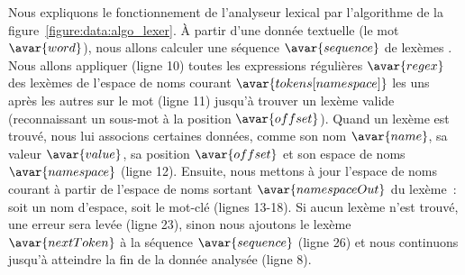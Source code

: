 Nous expliquons le fonctionnement de l'analyseur lexical par l'algorithme de la
figure~\ref{figure:data:algo_lexer}. À partir d'une donnée textuelle (le mot
$\avar{word}$), nous allons calculer une séquence $\avar{sequence}$ de lexèmes .
Nous allons appliquer (ligne 10) toutes les expressions régulières
$\avar{regex}$ des lexèmes de l'espace de noms courant
$\avar{tokens[namespace]}$ les uns après les autres sur le mot (ligne 11)
jusqu'à trouver un lexème valide (reconnaissant un sous-mot à la position
$\avar{offset}$). Quand un lexème est trouvé, nous lui associons certaines
données, comme son nom $\avar{name}$, sa valeur $\avar{value}$, sa position
$\avar{offset}$ et son espace de noms $\avar{namespace}$ (ligne 12). Ensuite,
nous mettons à jour l'espace de noms courant à partir de l'espace de noms
sortant $\avar{namespaceOut}$ du lexème~: soit un nom d'espace, soit le mot-clé
 (lignes 13-18).  Si aucun lexème n'est trouvé, une
erreur sera levée (ligne 23), sinon nous ajoutons le lexème $\avar{nextToken}$ à
la séquence $\avar{sequence}$ (ligne 26) et nous continuons jusqu'à atteindre la
fin de la donnée analysée (ligne 8).

